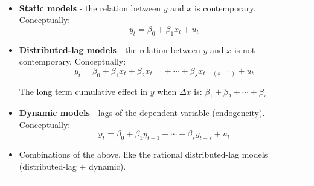 	\begin{f}{\ }
		

	\begin{itemize}[leftmargin=*]
		\item \textbf{Static models} - the relation between \(y\) and \(x\) is contemporary. Conceptually:
\[y_{t} = \beta_{0} + \beta_{1} x_{t} + u_{t}\]
		
		\item \textbf{Distributed-lag models} - the relation between \(y\) and \(x\) is not contemporary. Conceptually:
\[y_{t} = \beta_{0} + \beta_{1} x_{t} + \beta_{2} x_{t - 1} + \cdots + \beta_{s} x_{t - (s - 1)} + u_{t}\]
		
		The long term cumulative effect in \(y\) when \(\Delta x\) is:
			\(\beta_{1} + \beta_{2} + \cdots + \beta_{s}\)
		
		\item \textbf{Dynamic models} - lags of the dependent variable (endogeneity). Conceptually:
\[y_{t} = \beta_{0} + \beta_{1} y_{t - 1} + \cdots + \beta_{s} y_{t - s} + u_{t}\]
		
		\item Combinations of the above, like the rational distributed-lag models (distributed-lag + dynamic).
	\end{itemize}	

\end{f} 
 \hrule 
 

